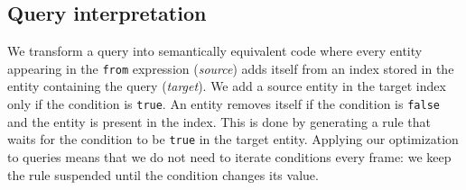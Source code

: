 \subsection{Query interpretation}


We transform a query into semantically equivalent code where every entity appearing in the \texttt{from} expression (\textit{source}) adds itself from an index stored in the entity containing the query (\textit{target}). We add a source entity in the target index only if the condition is \texttt{true}. An entity removes itself if the condition is \texttt{false} and the entity is present in the index. This is done by generating a rule that waits for the condition to be \texttt{true} in the target entity. Applying our optimization to queries means that we do not need to iterate conditions every frame: we keep the rule suspended until the condition changes its value.


